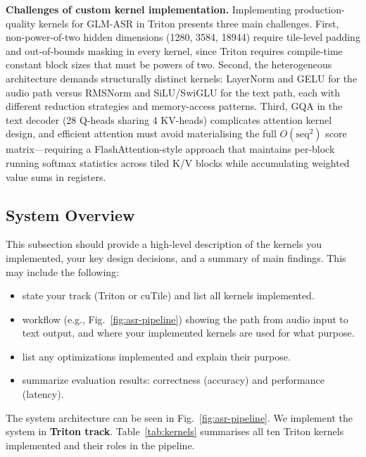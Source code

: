 \documentclass{article} %
\begin{document}
\textbf{Challenges of custom kernel implementation.}
Implementing production-quality kernels for GLM-ASR in Triton presents three main challenges.
First, non-power-of-two hidden dimensions (1280, 3584, 18944) require tile-level padding and out-of-bounds masking in every kernel, since Triton requires compile-time constant block sizes that must be powers of two.
Second, the heterogeneous architecture demands structurally distinct kernels: LayerNorm and GELU for the audio path versus RMSNorm and SiLU/SwiGLU for the text path, each with different reduction strategies and memory-access patterns.
Third, GQA in the text decoder (28 Q-heads sharing 4 KV-heads) complicates attention kernel design, and efficient attention must avoid materialising the full $O(\mathrm{seq}^2)$ score matrix---requiring a FlashAttention-style approach that maintains per-block running softmax statistics across tiled K/V blocks while accumulating weighted value sums in registers.

\subsection{System Overview}

This subsection should provide a high-level description of the kernels you
implemented, your key design decisions, and a summary of main findings. This may
include the following:

\begin{itemize}
\item state your track (Triton or cuTile) and list all kernels implemented. 
\item workflow (e.g., Fig.~\ref{fig:asr-pipeline}) showing the path from audio
  input to text output, and where your implemented kernels are used for what
  purpose. 
\item list any optimizations implemented and explain their purpose. 
\item summarize evaluation results: correctness (accuracy) and performance
  (latency). 
\end{itemize}
 

The system architecture can be seen in Fig.~\ref{fig:asr-pipeline}. We implement the system in \textbf{Triton track}.
Table~\ref{tab:kernels} summarises all ten Triton kernels implemented and their roles in the pipeline.
\end{document}
